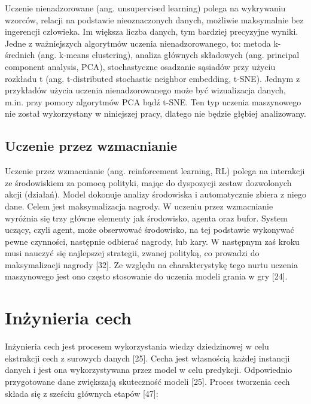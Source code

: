 Uczenie nienadzorowane (ang. unsupervised learning) polega na wykrywaniu wzorców, relacji na podstawie nieoznaczonych danych, możliwie maksymalnie bez ingerencji człowieka. Im większa liczba danych, tym bardziej precyzyjne wyniki. Jedne z ważniejszych algorytmów uczenia nienadzorowanego, to:
metoda k-średnich (ang. k-means clustering),
analiza głównych składowych (ang. principal component analysis, PCA),
stochastyczne osadzanie sąsiadów przy użyciu rozkładu t (ang. t-distributed stochastic neighbor embedding, t-SNE).
Jednym z przykładów użycia uczenia nienadzorowanego może być wizualizacja danych, m.in. przy pomocy algorytmów PCA bądź t-SNE. Ten typ uczenia maszynowego nie został wykorzystany w niniejszej pracy, dlatego nie będzie głębiej analizowany.

\subsection{Uczenie przez wzmacnianie}
\label{cha:cha3.2.4}

Uczenie przez wzmacnianie (ang. reinforcement learning, RL) polega na interakcji ze środowiskiem za pomocą polityki, mając do dyspozycji zestaw dozwolonych akcji (działań). Model dokonuje analizy środowiska i automatycznie zbiera z niego dane. Celem jest maksymalizacja nagrody. W uczeniu przez wzmacnianie wyróżnia się trzy główne elementy jak środowisko, agenta oraz bufor. System uczący, czyli agent, może obserwować środowisko, na tej podstawie wykonywać pewne czynności, następnie odbierać nagrody, lub kary. W następnym zaś kroku musi nauczyć się najlepszej strategii, zwanej polityką, co prowadzi do maksymalizacji nagrody [32]. Ze względu na charakterystykę tego nurtu uczenia maszynowego jest ono często stosowanie do uczenia modeli grania w gry [24].

\section{Inżynieria cech}
\label{cha:cha3.3}

Inżynieria cech jest procesem wykorzystania wiedzy dziedzinowej w celu ekstrakcji cech z surowych danych [25]. Cecha jest własnością każdej instancji danych i jest ona wykorzystywana przez model w celu predykcji. Odpowiednio przygotowane dane zwiększają skuteczność modeli [25]. Proces tworzenia cech składa się z sześciu głównych etapów [47]:

